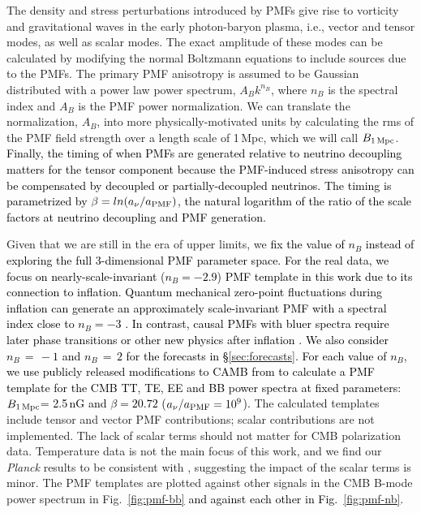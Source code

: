 \documentclass[apj]{emulateapj}
\newcommand{\bpmf}{\ensuremath{B_{\rm 1\,Mpc}}}
\newcommand{\planck}{{\sl Planck}}
\newcommand{\changed}[1]{\textcolor{Black}{#1}}
\begin{document}
The density and stress perturbations introduced by PMFs give rise to vorticity and gravitational waves in the early photon-baryon  plasma, i.e., vector and tensor modes, as well as scalar modes. 
The exact amplitude of these modes can be calculated by modifying the normal Boltzmann equations to include sources due to the PMFs. 
The primary PMF anisotropy is assumed to be Gaussian distributed with a power law power spectrum, $A_B k^{n_B}$, where $n_B$ is the spectral index and $A_B$ is the PMF power normalization. 
We can translate the normalization, $A_B$, into more physically-motivated units by calculating the rms of the PMF field strength over a length scale of 1\,Mpc, which we will call \bpmf. 
\changed{
Finally, the timing of when PMFs are generated relative to neutrino decoupling matters for the tensor component because the PMF-induced stress anisotropy can be compensated by decoupled or partially-decoupled neutrinos. 
The timing is  parametrized by $\beta = ln(a_{\nu}/a_{\rm{PMF}})$,  the natural logarithm of the ratio of the scale factors at neutrino decoupling and PMF generation. 
}

Given that we are still in the era of upper limits, we \changed{fix the value of $n_B$ instead of exploring the full 3-dimensional PMF parameter space. 
For the real data, we focus on nearly-scale-invariant ($n_B = -2.9$) PMF template in this work due to its connection to inflation.  
Quantum mechanical zero-point fluctuations during inflation can generate an approximately scale-invariant PMF with a spectral index close to $n_B = -3$ \citep[e.g.,][]{turner88, mack01,2008PhRvD..78f3012K}. %
In contrast, causal PMFs with bluer spectra require later phase transitions or other new physics after inflation \citep[e.g.,][]{durrer03, subramanian16}. 
We also consider $n_B\,=\,-1$ and $n_B\,=\,2$ for the forecasts in \S\ref{sec:forecasts}. 
For each value of $n_B$, we use publicly released modifications to CAMB from \citet{zucca16} to calculate a PMF template for the CMB TT, TE, EE and BB power spectra at fixed parameters: \bpmf = 2.5\,nG and $\beta=20.72$ ($a_{\nu}/a_{\rm{PMF}} = 10^9$).} 
The calculated templates include tensor and vector PMF contributions; scalar contributions are not implemented. 
The lack of scalar terms should not matter for CMB polarization data. 
Temperature data is not the main focus of this work, and we find our \planck{} results  to be consistent with \citet{planck15-19}, suggesting the impact of the scalar terms is minor. 
The PMF templates are plotted against other signals in the CMB B-mode power spectrum in Fig.~\ref{fig:pmf-bb} \changed{and against each other in Fig.~\ref{fig:pmf-nb}. }
\end{document}
